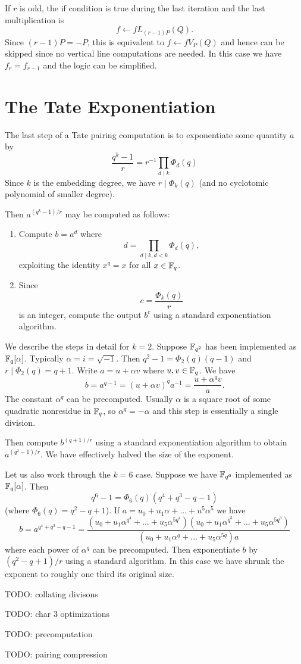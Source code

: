 If $r$ is odd, the if condition is true during the last iteration and
the last multiplication is
\[ f \leftarrow f L_{(r-1)P}(Q) .\]
Since $(r-1)P = -P$, this is equivalent to $f \leftarrow f V_P(Q)$
and hence can be skipped since no vertical line computations are needed.
In this case we have $f_r = f_{r-1}$ and the logic can be simplified.

\section {The Tate Exponentiation}

The last step of a Tate pairing computation is
to exponentiate some quantity $a$ by
\[ \frac{q^k-1}{r} = r^{-1} \prod_{d\mid k} \Phi_d(q) \]
Since $k$ is the embedding degree, we have $r \mid \Phi_k(q)$ (and no
cyclotomic polynomial of smaller degree).

Then $a^{(q^k-1)/r}$ may be computed as follows:
\begin{enumerate}
\item
Compute $b = a^d $ where
\[ d = \prod_{d\mid k, d<k} \Phi_d(q) , \]
exploiting the identity $x^q = x$ for all $x \in \mathbb{F}_q$.
\item
Since
\[ c = \frac{\Phi_k(q)}{r} \]
is an integer, compute the output $b^c$
using a standard exponentiation algorithm.
\end{enumerate}

We describe the steps in detail
for $k = 2$. Suppose $\mathbb{F}_{q^2}$ has been implemented
as $\mathbb{F}_q[\alpha]$. Typically $\alpha = i = \sqrt{-1}$.
Then $q^2 - 1 = \Phi_2(q)(q-1)$ and
$r \mid \Phi_2(q) = q + 1$. Write $a = u + \alpha v$ where $u,v \in \mathbb{F}_q$.
We have
\[ b = a^{q-1} = (u + \alpha v)^q a^{-1} = \frac{u + \alpha^q v}{a} .\]
The constant $\alpha^q$ can be precomputed. Usually $\alpha$ is a square root
of some quadratic nonresidue in $\mathbb{F}_q$, so $\alpha^q = -\alpha$ and
this step is essentially a single division.

Then compute $b^{(q+1)/r}$ using a standard exponentiation algorithm
to obtain $a^{(q^2-1)/r}$. We have effectively halved the size of the exponent.

Let us also work through the $k = 6$ case. Suppose we have $\mathbb{F}_{q^6}$
implemented as $\mathbb{F}_q[\alpha]$. Then
\[ q^6 - 1 = \Phi_6(q) (q^4 + q^3 - q - 1)\]
(where $\Phi_6(q) = q^2 - q + 1$).
If $a = u_0 + u_1 \alpha + ... + u^5 \alpha^5$ we have
\[ b =
a^{q^4 + q^3 - q - 1}
= \frac{
(u_0 + u_1 \alpha^{q^4} + ... + u_5 \alpha^{5q^4})
(u_0 + u_1 \alpha^{q^3} + ... + u_5 \alpha^{5q^3})}
{
(u_0 + u_1 \alpha^q + ... + u_5 \alpha^{5q})a
}
\]
where each power of $\alpha^q$ can be precomputed. Then exponentiate $b$
by $(q^2 - q + 1)/r$ using a standard algorithm.
In this case we have shrunk the exponent to roughly one third its original
size.

TODO: collating divisons

TODO: char 3 optimizations

TODO: precomputation

TODO: pairing compression

